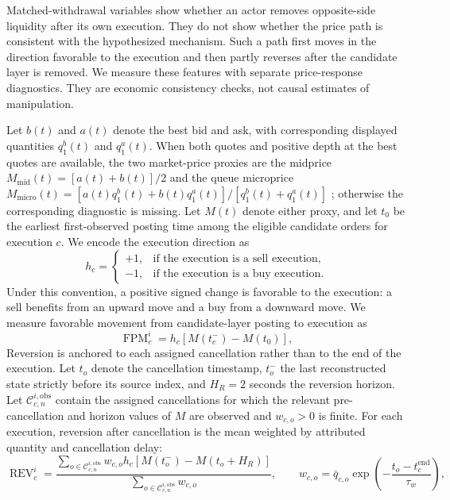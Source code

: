 \documentclass[11pt]{article}
\begin{document}
Matched-withdrawal variables show whether an actor removes opposite-side liquidity after its own execution. They do not
show whether the price path is consistent with the hypothesized mechanism. Such a path first moves in the direction favorable
to the execution and then partly reverses after the candidate layer is removed. We measure these features with separate
price-response diagnostics. They are economic consistency checks, not causal
estimates of manipulation.

Let $b(t)$ and $a(t)$ denote the best bid and ask, with corresponding displayed quantities $q^b_1(t)$ and $q^a_1(t)$. When
both quotes and positive depth at the best quotes are available, the two market-price proxies are the midprice
$M_{\mathrm{mid}}(t)=[a(t)+b(t)]/2$ and the queue microprice
$M_{\mathrm{micro}}(t)=[a(t)q^b_1(t)+b(t)q^a_1(t)]/[q^b_1(t)+q^a_1(t)]$
\cite{Stoikov02122018}; otherwise the corresponding diagnostic is missing. Let $M(t)$ denote either proxy, and let $t_0$
be the earliest first-observed posting time among the eligible candidate orders for execution $c$. We encode the
execution direction as
\begin{equation}
    h_c=
    \begin{cases}
        +1, & \text{if the execution is a sell execution,}\\
        -1, & \text{if the execution is a buy execution.}
    \end{cases}
    \label{eq:price_response_direction}
\end{equation}
Under this convention, a positive signed change is favorable to the execution: a sell benefits from an upward move and a
buy from a downward move. We measure favorable movement from candidate-layer posting to execution as
\begin{equation}
    \operatorname{FPM}^{i}_{c}
    =
    h_c\left[M(t_c^{-})-M(t_0)\right],
    \label{eq:favorable_price_move}
\end{equation}
Reversion is anchored to each assigned cancellation rather than to the end of the execution. Let $t_o$ denote the
cancellation timestamp, $t_o^{-}$ the last reconstructed state strictly before its source index, and $H_R=2$ seconds the
reversion horizon. Let $\mathcal{C}_{c,n}^{i,\mathrm{obs}}$ contain the assigned cancellations for which the relevant
pre-cancellation and horizon values of $M$ are observed and $w_{c,o}>0$ is finite. For each execution, reversion after
cancellation is the mean weighted by attributed quantity and cancellation delay:
\begin{equation}
    \operatorname{REV}^{i}_{c}
    =
    \frac{
        \sum_{o\in\mathcal{C}_{c,n}^{i,\mathrm{obs}}}
        w_{c,o}h_c\left[M(t_o^{-})-M(t_o+H_R)\right]
    }{
        \sum_{o\in\mathcal{C}_{c,n}^{i,\mathrm{obs}}} w_{c,o}
    },
    \qquad
    w_{c,o}=\bar q_{c,o}\exp\!\left(-\frac{t_o-t_c^{\mathrm{end}}}{\tau_w}\right),
    \label{eq:price_reversion}
\end{equation}
\end{document}
